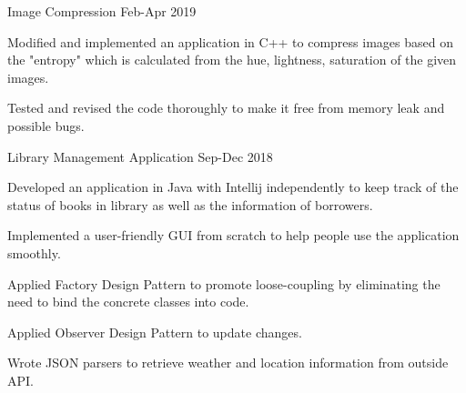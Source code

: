 
\begin{cventries}
  
    
    \cventry
    {} %
    {Image Compression} %
    {} %
    {Feb-Apr 2019} %
    {
      \begin{cvitems} %
        \item {Modified and implemented an application in C++ to compress images based on the "entropy" which is calculated from the hue, lightness, saturation of the given images.}
		\item {Tested and revised the code thoroughly to make it free from memory leak and possible bugs.}
      \end{cvitems}
    }
    
    \cventry
    {} %
    {Library Management Application} %
    {} %
    {Sep-Dec 2018} %
    {
      \begin{cvitems} %
        \item {Developed an application in Java with Intellij independently to keep track of the status of books in library as well as the information of borrowers.}
		\item{Implemented a user-friendly GUI from scratch to help people use the application smoothly.}
		\item{Applied Factory Design Pattern to promote loose-coupling by eliminating the need to bind the concrete classes into code.}
		\item{Applied Observer Design Pattern to update changes. }
		\item {Wrote JSON parsers to retrieve weather and location information from outside API.}
      \end{cvitems}
    }
    
    
\end{cventries}